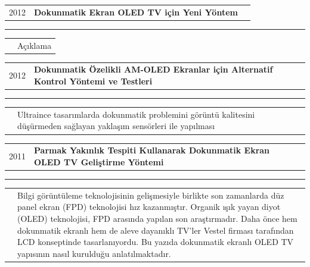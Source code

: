 \documentclass[10pt,A4]{article}
\newcommand{\tzlarrow}{(0,0) -- (0.2,0) -- (0.3,0.2) -- (0.2,0.4) -- (0,0.4) -- (0.1,0.2) -- cycle;}
\newcommand{\larrow}[1]
{\begin{tikzpicture}[scale=0.58]
	 \filldraw[fill=#1!100,draw=#1!100!black]  \tzlarrow
 \end{tikzpicture}
}
\newcommand{\cvevent}[5]
{
\vspace{8pt}
	\begin{tabular*}{1\textwidth}{p{3.3cm} p{11.9cm} x{9.5cm}}
 \textcolor{bgcol}{#1}& \textbf{#2} & \vspace{3.5pt}\textcolor{sectcol}{#3}

	\end{tabular*}
\vspace{-2pt}
\textcolor{softcol}{\hrule}
\vspace{6pt}
	\begin{tabular*}{1\textwidth}{p{1.3cm} p{15.4cm}}
&		 \larrow{bgcol} #4\\[3pt]
	\end{tabular*}

}
\newcommand{\patent}[5]
{
	\vspace{8pt}
	\begin{tabular*}{1\textwidth}{p{1.3cm} p{11.9cm} x{9.5cm}}
		\textcolor{bgcol}{#1}& \textbf{#2} & \vspace{3.5pt}\textcolor{sectcol}{#3}
		
	\end{tabular*}
	\vspace{-2pt}
	\textcolor{softcol}{\hrule}
	\vspace{6pt}
	\begin{tabular*}{1\textwidth}{p{1.3cm} p{15.4cm}}
		&		 \larrow{bgcol} #4\\[3pt]
	\end{tabular*}
	
}
\newcommand{\mystrut}{\rule[-.3\baselineskip]{0pt}{\baselineskip}}
\begin{document}
\patent{2012}{Dokunmatik Ekran OLED TV için Yeni Yöntem}{}{Açıklama}{}
\patent{2012}{Dokunmatik Özelikli AM-OLED Ekranlar için Alternatif Kontrol Yöntemi ve Testleri }{}{Ultraince tasarımlarda dokunmatik problemini görüntü kalitesini düşürmeden sağlayan yaklaşım sensörleri ile yapılması}\\
\patent{2011}{Parmak Yakınlık Tespiti Kullanarak Dokunmatik Ekran OLED TV Geliştirme Yöntemi}{}{Bilgi görüntüleme teknolojisinin gelişmesiyle birlikte son zamanlarda düz panel ekran (FPD) teknolojisi hız kazanmıştır. Organik ışık yayan diyot (OLED) teknolojisi, FPD arasında yapılan son araştırmadır. Daha önce hem dokunmatik ekranlı hem de aleve dayanıklı TV'ler Vestel firması tarafından LCD konseptinde tasarlanıyordu. Bu yazıda dokunmatik ekranlı OLED TV yapısının nasıl kurulduğu anlatılmaktadır.}\\
\vspace{5pt}


\vspace{77pt}



%
%
%
%
%
%
\end{document}
